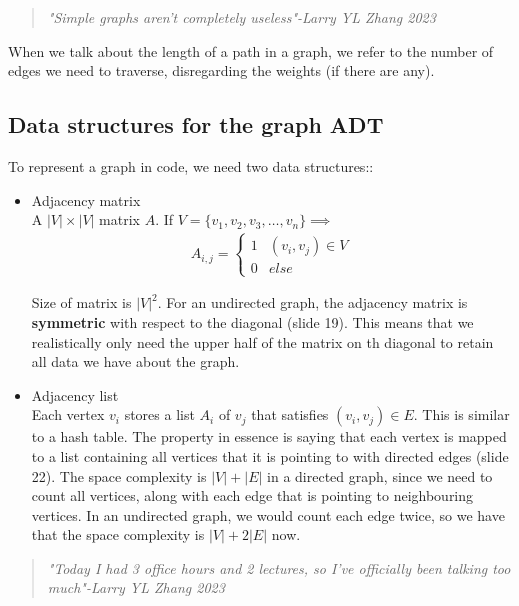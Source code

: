 \documentclass[12pt]{book}
\begin{document}
\begin{quote}
    \textit{"Simple graphs aren't completely useless"-Larry YL Zhang 2023}
\end{quote}

When we talk about the length of a path in a graph, we refer to the number of edges we need to traverse, disregarding the weights (if there are any).

\subsection*{Data structures for the graph ADT}

To represent a graph in code, we need two data structures::

\begin{itemize}
    \item Adjacency matrix\\
    A $|V|\times |V|$ matrix $A$. If $V=\{v_1,v_2,v_3,\ldots,v_n\}\implies$
    \begin{align*}
        A_{i,j}=\begin{cases}
            1&(v_i,v_j)\in V\\
            0&else
        \end{cases}
    \end{align*}

    Size of matrix is $|V|^2$. For an undirected graph, the adjacency matrix is \textbf{symmetric} with respect to the diagonal (slide 19). This means that we realistically only need the upper half of the matrix on th diagonal to retain all data we have about the graph.
    \item Adjacency list\\
    Each vertex $v_i$ stores a list $A_i$ of $v_j$ that satisfies $(v_i,v_j)\in E$. This is similar to a hash table. The property in essence is saying that each vertex is mapped to a list containing all vertices that it is pointing to with directed edges (slide 22). The space complexity is $|V|+|E|$ in a directed graph, since we need to count all vertices, along with each edge that is pointing to neighbouring vertices. In an undirected graph, we would count each edge twice, so we have that the space complexity is $|V|+2|E|$ now.
\end{itemize}

\begin{quote}
    \textit{"Today I had 3 office hours and 2 lectures, so I've officially been talking too much"-Larry YL Zhang 2023}
\end{quote}
\end{document}
